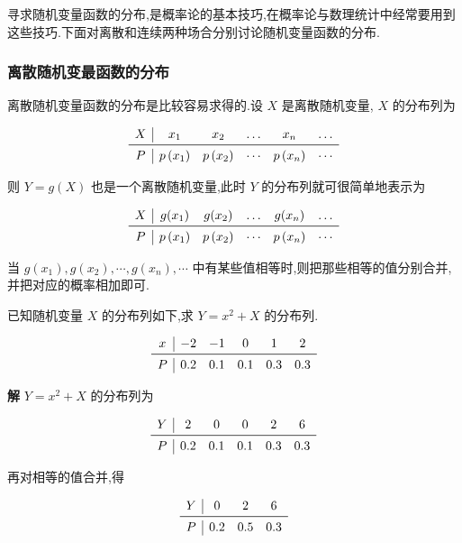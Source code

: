 寻求随机变量函数的分布,是概率论的基本技巧,在概率论与数理统计中经常要用到这些技巧.下面对离散和连续两种场合分别讨论随机变量函数的分布.

\subsubsection{离散随机变最函数的分布}

离散随机变量函数的分布是比较容易求得的.设 $ X $ 是离散随机变量, $ X $ 的分布列为

\[
\begin{array}{c|ccccc}
{X} & {x_{1}} & {x_{2}} & {\dots} & {x_{n}} & {\dots} \\ \midrule 
P & {p\left(x_{1}\right)} & {p\left(x_{2}\right)} & {\cdots} & {p\left(x_{n}\right)} & {\cdots}
\end{array}
\]

则 $ Y=g(X) $ 也是一个离散随机变量,此时 $ Y $ 的分布列就可很简单地表示为

\[
\begin{array}{c|ccccc}
{X} & {g(x_{1})} & {g(x_{2})} & {\dots} & {g(x_{n})} & {\dots} \\ \midrule 
P & {p\left(x_{1}\right)} & {p\left(x_{2}\right)} & {\cdots} & {p\left(x_{n}\right)} & {\cdots}
\end{array}
\]

当 $ g\left(x_{1}\right), g\left(x_{2}\right), \cdots, g\left(x_{n}\right), \cdots $ 中有某些值相等时,则把那些相等的值分别合并,并把对应的概率相加即可.

\begin{example}
	已知随机变量 $ X $ 的分布列如下,求 $ Y=x^{2}+X $ 的分布列.
	
	\[
	\begin{array}{c|ccccc}
	x & {-2} & {-1} & {0} & {1} & {2} \\ \midrule
	P & {0.2} & {0.1} & {0.1} & {0.3} & {0.3} \\ 
	\end{array}
	\]
	
	\textbf{解} $ Y=x^{2}+X $ 的分布列为
	
	\[
	\begin{array}{c|ccccc}
	Y & {2} & {0} & {0} & {2} & {6} \\ \midrule 
	P & {0.2} & {0.1} & {0.1} & {0.3} & {0.3}
	\end{array}
	\]
	
	再对相等的值合并,得
	
	\[
	\begin{array}{c|ccc}
	Y & {0} & {2} & {6} \\ \midrule 
	P & {0.2} & {0.5} & {0.3} \\
	\end{array}
	\]
	
\end{example}

